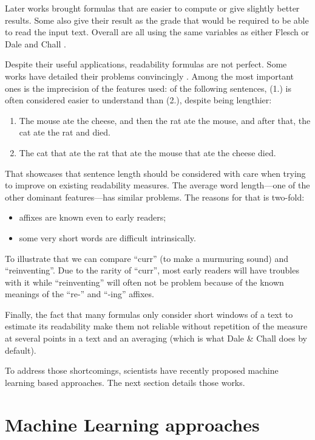 \documentclass[a4paper, 11pt, onepage]{scrreprt}
\begin{document}
Later works brought formulas that are easier to compute or give
slightly better results. Some also give their result as the grade that
would be required to be able to read the input text. Overall are all
using the same variables as either Flesch or Dale and Chall
\cite{mclaughlin1969smog, kincaid1975derivation,
  chall1995readability}.

Despite their useful applications, readability formulas are not
perfect. Some works have detailed their problems convincingly
\cite{duffy1985readability, schriver2000readability}. Among the most
important ones is the imprecision of the features used: of the
following sentences, (1.)  is often considered easier to understand
than (2.), despite being lengthier:
\begin{enumerate}
\item The mouse ate the cheese, and then the rat ate the mouse, and
  after that, the cat ate the rat and died.
\item The cat that ate the rat that ate the mouse that ate the cheese
  died.
\end{enumerate}
That showcases that sentence length should be considered with care
when trying to improve on existing readability measures. The average
word length—one of the other dominant features—has similar
problems. The reasons for that is two-fold:
\begin{itemize}
\item affixes are known even to early readers;
\item some very short words are difficult intrinsically.
\end{itemize}
To illustrate that we can compare “curr” (to make a murmuring sound)
and “reinventing”. Due to the rarity of “curr”, most early readers
will have troubles with it while “reinventing” will often not be
problem because of the known meanings of the “re-” and “-ing” affixes.

Finally, the fact that many formulas only consider short windows of a
text to estimate its readability make them not reliable without
repetition of the measure at several points in a text and an averaging
(which is what Dale \& Chall does by default).

To address those shortcomings, scientists have recently proposed
machine learning based approaches. The next section details those
works.

\section{Machine Learning approaches}
\label{sec:ml-approaches}
\end{document}

